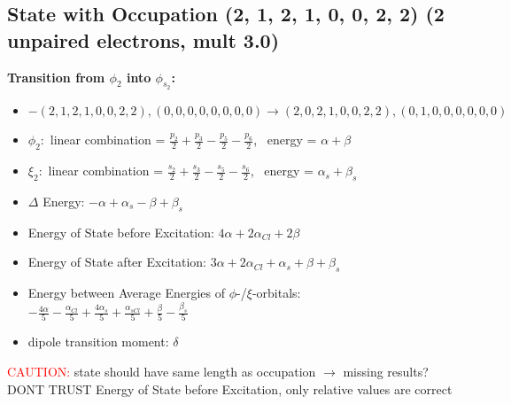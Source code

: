 \documentclass[12pt,a4paper]{article}
\begin{document}
\subsection*{State with Occupation (2, 1, 2, 1, 0, 0, 2, 2) (2 unpaired electrons, mult 3.0)}
        \noindent\textbf{Transition from $\phi_{2}$ into $\phi_{s_{2}}$:}
        \begin{itemize}
            \item $- (2, 1, 2, 1, 0, 0, 2, 2), (0, 0, 0, 0, 0, 0, 0, 0) \rightarrow (2, 0, 2, 1, 0, 0, 2, 2), (0, 1, 0, 0, 0, 0, 0, 0)$
        
            \item $\phi_{2}:$ linear combination = $\frac{p_{2}}{2} + \frac{p_{3}}{2} - \frac{p_{5}}{2} - \frac{p_{6}}{2}$, \
            energy = $\alpha + \beta$
            
            \item $\xi_{2}:$ linear combination = $\frac{s_{2}}{2} + \frac{s_{3}}{2} - \frac{s_{5}}{2} - \frac{s_{6}}{2}$, \
            energy = $\alpha_{s} + \beta_{s}$
            
            \item $\Delta$ Energy: $- \alpha + \alpha_{s} - \beta + \beta_{s}$
            \item Energy of State before Excitation: $4 \alpha + 2 \alpha_{Cl} + 2 \beta$
            \item Energy of State after Excitation: $3 \alpha + 2 \alpha_{Cl} + \alpha_{s} + \beta + \beta_{s}$
            \item Energy between Average Energies of $\phi$-/$\xi$-orbitals: \
            $- \frac{4 \alpha}{5} - \frac{\alpha_{Cl}}{5} + \frac{4 \alpha_{s}}{5} + \frac{\alpha_{s Cl}}{5} + \frac{\beta}{5} - \frac{\beta_{s}}{5}$
        
            \item dipole transition moment: $\delta$
        
        \end{itemize}
        
	\textcolor{red}{CAUTION:} state should have same length as occupation $\rightarrow$ missing results?
	DONT TRUST \glqq{}Energy of State before Excitation\grqq{}, only relative values are correct
\end{document}

